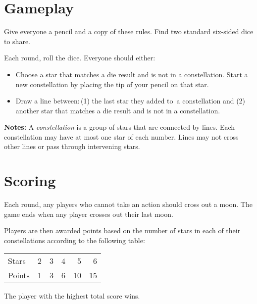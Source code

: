 \section*{Gameplay}
%

Give everyone a pencil and a copy of these rules. Find two standard six-sided dice to share.

Each round, roll the dice. Everyone should either:
\begin{itemize}[leftmargin=*]
	\item Choose a star that matches a die result and is not in a constellation. Start a new constellation by placing the tip of your pencil on that star.%
	\item Draw a line between:\,(1) the last star they added to~a constellation and (2) another star that matches a die result and is not in a constellation.
\end{itemize}


\vfill

\textbf{Notes:} A \emph{constellation} is a group of stars that are connected by lines. Each constellation may have at most one star of each number. Lines may not cross other lines or pass through intervening stars.\vfill\null\columnbreak

\section*{Scoring}
Each round, any players who cannot take an action should cross out a moon. The game ends when any player crosses out their last moon.

Players are then awarded points based on the number of stars in each of their constellations according to the following table:

\begin{center}
\begin{tabular}{l rrrrr} \toprule[0.5pt]
Stars & 2 & 3 & 4 & 5 & 6 \\
Points & \phantom{1}1 & \phantom{1}3 &\phantom{1}6 & 10 & 15 \\ \bottomrule[0.5pt]
\end{tabular}
\end{center}

The player with the highest total score wins.
